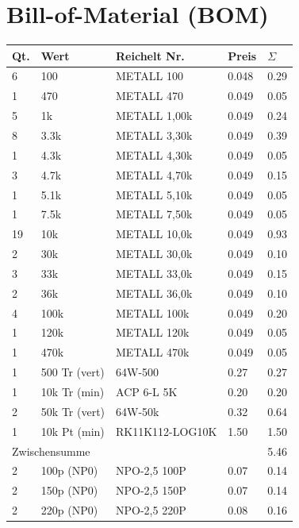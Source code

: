 \documentclass[10pt, a4paper]{paper}
\begin{document}
\section{Bill-of-Material (BOM)}
\begin{longtable}{|p{}|p{}|p{}|p{}|p{}|}\hline
Qt.& Wert         & Reichelt Nr.    & Preis & $\Sigma$ \\\hline \hline
 6 & 100          & METALL 100      & 0.048 & 0.29 \\
 1 & 470          & METALL 470      & 0.049 & 0.05 \\
 5 & 1k           & METALL 1,00k    & 0.049 & 0.24 \\
 8 & 3.3k         & METALL 3,30k    & 0.049 & 0.39 \\
 1 & 4.3k         & METALL 4,30k    & 0.049 & 0.05 \\
 3 & 4.7k         & METALL 4,70k    & 0.049 & 0.15 \\
 1 & 5.1k         & METALL 5,10k    & 0.049 & 0.05 \\
 1 & 7.5k         & METALL 7,50k    & 0.049 & 0.05 \\
19 & 10k          & METALL 10,0k    & 0.049 & 0.93 \\
 2 & 30k          & METALL 30,0k    & 0.049 & 0.10 \\
 3 & 33k          & METALL 33,0k    & 0.049 & 0.15 \\
 2 & 36k          & METALL 36,0k    & 0.049 & 0.10 \\
 4 & 100k         & METALL 100k     & 0.049 & 0.20 \\
 1 & 120k         & METALL 120k     & 0.049 & 0.05 \\
 1 & 470k         & METALL 470k     & 0.049 & 0.05 \\
 1 & 500 Tr (vert)& 64W-500         & 0.27  & 0.27 \\
 1 & 10k Tr (min) & ACP 6-L 5K      & 0.20  & 0.20 \\
 2 & 50k Tr (vert)& 64W-50k         & 0.32  & 0.64 \\
 1 & 10k Pt (min) & RK11K112-LOG10K & 1.50  & 1.50 \\ \hline
 \multicolumn{4}{|l|}{Zwischensumme}        & 5.46 \\ \hline 
 2 & 100p (NP0)   & NPO-2,5 100P    & 0.07  & 0.14 \\
 2 & 150p (NP0)   & NPO-2,5 150P    & 0.07  & 0.14 \\
 2 & 220p (NP0)   & NPO-2,5 220P    & 0.08  & 0.16 \\

\end{longtable}
\end{document}

